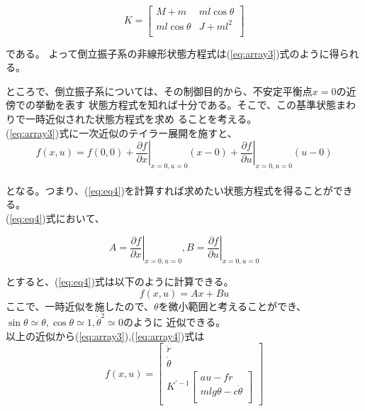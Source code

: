 	\begin{equation}
		K=\left[
		\begin{array}{ccc}
			M+m & ml\cos{\theta}\\
			ml\cos{\theta} & J+ml^{2}\\
		\end{array}
		\right]
		\label{eq:array4}
	\end{equation}
	
	である。
	よって倒立振子系の非線形状態方程式は(\ref{eq:array3})式のように得られる。
	\par
	ところで、倒立振子系については、その制御目的から、不安定平衡点$x=0$の近傍での挙動を表す
	状態方程式を知れば十分である。そこで、この基準状態まわりで一時近似された状態方程式を求め
	ることを考える。\\
	(\ref{eq:array3})式に一次近似のテイラー展開を施すと、\\
	\begin{equation}
		f(x,u) = f(0,0) + \left.\frac{\partial f}{\partial x}\right|_{x=0,u=0}(x-0) + \left.\frac{\partial f}{\partial u}\right|_{x=0,u=0}(u-0)
		\label{eq:eq4}
	\end{equation}
	\\
	となる。つまり、(\ref{eq:eq4})を計算すれば求めたい状態方程式を得ることができる。\\
	(\ref{eq:eq4})式において、
	
	\[A=\left.\frac{\partial f}{\partial x}\right|_{x=0,u=0} , B=\left.\frac{\partial f}{\partial u}\right|_{x=0,u=0}\]
	
	とすると、(\ref{eq:eq4})式は以下のように計算できる。
	\begin{equation}
		f(x,u) = Ax+Bu
		\label{eq:AxBu}
	\end{equation}
	ここで、一時近似を施したので、$\theta$を微小範囲と考えることができ、\\ $\sin{\theta} \simeq  \theta , \cos{\theta} \simeq 1 , \dot{\theta}^{2} \simeq 0$のように
	近似できる。\\
	以上の近似から(\ref{eq:array3}),(\ref{eq:array4})式は\\
	\begin{equation}
		f(x,u)=\left[
		\begin{array}{ccc}
			\dot{r}\\
			\dot{\theta}\\
			K^{'-1}\left[
			\begin{array}{ccc}
				au-f\dot{r}\\
				mlg\theta-c\dot{\theta}\\
			\end{array}
			\right]
		\end{array}
		\right]
		\label{eq:array5}
	\end{equation}
	
